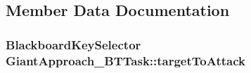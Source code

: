 \subsection{Member Data Documentation}
\subsubsection[{\texorpdfstring{target\+To\+Attack}{targetToAttack}}]{\setlength{\rightskip}{0pt plus 5cm}Blackboard\+Key\+Selector Giant\+Approach\+\_\+\+B\+T\+Task\+::target\+To\+Attack}\hypertarget{class_giant_approach___b_t_task_a6296d9126f5fc2e18266249e91090b18}{}\label{class_giant_approach___b_t_task_a6296d9126f5fc2e18266249e91090b18}
